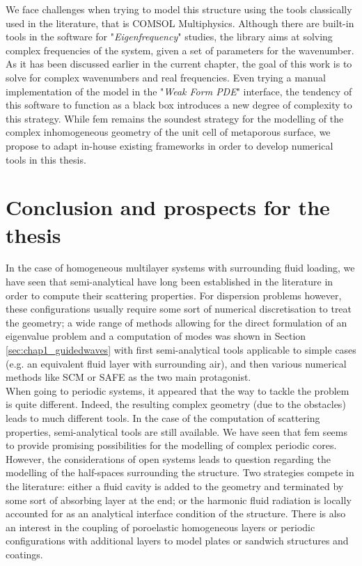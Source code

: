 We face challenges when trying to model this structure using the tools classically used in the literature, that is COMSOL Multiphysics. Although there are built-in tools in the software for "\emph{Eigenfrequency}" studies, the library aims at solving complex frequencies of the system, given a set of parameters for the wavenumber. As it has been discussed earlier in the current chapter, the goal of this work is to solve for complex wavenumbers and real frequencies. Even trying a manual implementation of the model in the "\emph{Weak Form PDE}" interface, the tendency of this software to function as a black box introduces a new degree of complexity to this strategy. While \acrshort{fem} remains the soundest strategy for the modelling of the complex inhomogeneous geometry of the unit cell of metaporous surface, we propose to adapt in-house existing frameworks in order to develop numerical tools in this thesis.  

\section{Conclusion and prospects for the thesis}
In the case of homogeneous multilayer systems with surrounding fluid loading, we have seen that semi-analytical have long been established in the literature in order to compute their scattering properties. For dispersion problems however, these configurations usually require some sort of numerical discretisation to treat the geometry; a wide range of methods allowing for the direct formulation of an eigenvalue problem and a computation of modes was shown in Section \ref{sec:chap1_guidedwaves} with first semi-analytical tools applicable to simple cases (e.g. an equivalent fluid layer with surrounding air), and then various numerical methods like SCM or SAFE as the two main protagonist.\\

When going to periodic systems, it appeared that the way to tackle the problem is quite different. Indeed, the resulting complex geometry (due to the obstacles) leads to much different tools. In the case of the computation of scattering properties, semi-analytical tools are still available. We have seen that \acrshort{fem} seems to provide promising possibilities for the modelling of complex periodic cores. However, the considerations of open systems leads to question regarding the modelling of the half-spaces surrounding the structure. Two strategies compete in the literature: either a fluid cavity is added to the geometry and terminated by some sort of absorbing layer at the end; or the harmonic fluid radiation is locally accounted for as an analytical interface condition of the structure. There is also an interest in the coupling of poroelastic homogeneous layers or periodic configurations with additional layers to model plates or sandwich structures and coatings.